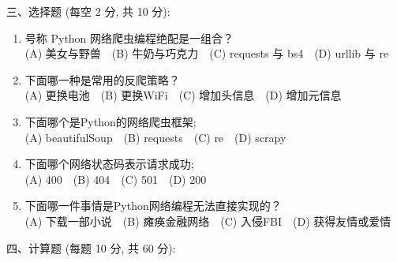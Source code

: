 \documentclass[12pt,a4paper]{ctexart}%
\begin{document}
%
\noindent 三、选择题 (每空 2 分, 共 10 分):%
\begin{enumerate}[1)]%
\item%
号称 Python 网络爬虫编程绝配是一组合？~~\\
(A) 美女与野兽~~(B) 牛奶与巧克力~~(C) requests 与 bs4~~(D) urllib 与 re%
\item%
下面哪一种是常用的反爬策略？~~\\
(A) 更换电池~~(B) 更换WiFi~~(C) 增加头信息~~(D) 增加元信息%
\item%
下面哪个是Python的网络爬虫框架;~~\\
(A) beautifulSoup~~(B) requests~~(C) re~~(D) scrapy%
\item%
下面哪个网络状态码表示请求成功;~~\\
(A) 400~~(B) 404~~(C) 501~~(D) 200%
\item%
下面哪一件事情是Python网络编程无法直接实现的？~~\\
(A) 下载一部小说~~(B) 瘫痪金融网络~~(C) 入侵FBI~~(D) 获得友情或爱情%
\end{enumerate}%


%
\noindent 四、计算题 (每题 10 分, 共 60 分):%
%
\end{document}
